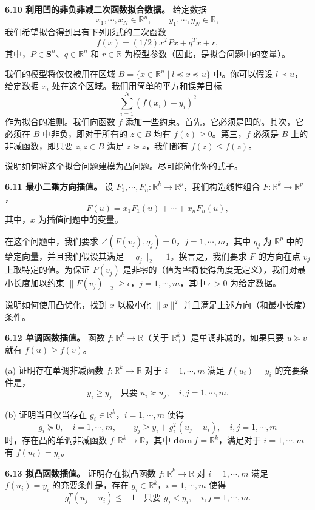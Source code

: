 \documentclass[UTF8,12pt,a4paper,fontset=fandol]{ctexart}
\begin{document}
\noindent\textbf{6.10 利用凹的非负非减二次函数拟合数据。}\quad
给定数据
\[
x_1,\cdots,x_N\in\mathbb{R}^n,\qquad y_1,\cdots,y_N\in\mathbb{R},
\]
我们希望拟合得到具有下列形式的二次函数
\[
f(x)=(1/2)x^TPx+q^Tx+r,
\]
其中，$P\in\mathbf{S}^n$、$q\in\mathbb{R}^n$ 和 $r\in\mathbb{R}$ 为模型参数（因此，是拟合问题中的变量）。

我们的模型将仅仅被用在区域 $B=\{x\in\mathbb{R}^n\mid l\preceq x\preceq u\}$ 中。你可以假设 $l\prec u$，给定数据 $x_i$ 处在这个区域。我们用简单的平方和误差目标
\[
\sum_{i=1}^N(f(x_i)-y_i)^2
\]
作为拟合的准则。我们向函数 $f$ 添加一些约束。首先，它必须是凹的。其次，它必须在 $B$ 中非负，即对于所有的 $z\in B$ 均有 $f(z)\geq 0$。第三，$f$ 必须是 $B$ 上的非减函数，即只要 $z,\bar{z}\in B$ 满足 $z\succeq \bar{z}$，我们都有 $f(z)\leq f(\bar{z})$。

说明如何将这个拟合问题建模为凸问题。尽可能简化你的式子。

\noindent\textbf{6.11 最小二乘方向插值。}\quad
设 $F_1,\cdots,F_n:\mathbb{R}^k\to\mathbb{R}^p$，我们构造线性组合 $F:\mathbb{R}^k\to\mathbb{R}^p$，
\[
F(u)=x_1F_1(u)+\cdots+x_nF_n(u),
\]
其中，$x$ 为插值问题中的变量。

在这个问题中，我们要求 $\angle(F(v_j),q_j)=0$，$j=1,\cdots,m$，其中 $q_j$ 为 $\mathbb{R}^p$ 中的给定向量，并且我们假设其满足 $\|q_j\|_2=1$。换言之，我们要求 $F$ 的方向在点 $v_j$ 上取特定的值。为保证 $F(v_j)$ 是非零的（值为零将使得角度无定义），我们对最小长度加以约束 $\|F(v_j)\|_2\geq \epsilon$，$j=1,\cdots,m$，其中 $\epsilon>0$ 为给定数据。

说明如何使用凸优化，找到 $x$ 以极小化 $\|x\|^2$ 并且满足上述方向（和最小长度）条件。

\noindent\textbf{6.12 单调函数插值。}\quad
函数 $f:\mathbb{R}^k\to\mathbb{R}$（关于 $\mathbb{R}_+^k$）是单调非减的，如果只要 $u\succeq v$ 就有 $f(u)\geq f(v)$。

(a) 证明存在单调非减函数 $f:\mathbb{R}^k\to\mathbb{R}$ 对于 $i=1,\cdots,m$ 满足 $f(u_i)=y_i$ 的充要条件是，
\[
y_i\geq y_j\quad \text{只要 }u_i\succeq u_j,\quad i,j=1,\cdots,m.
\]

(b) 证明当且仅当存在 $g_i\in\mathbb{R}^k$，$i=1,\cdots,m$ 使得
\[
g_i\succeq 0,\quad i=1,\cdots,m,\qquad
y_j\geq y_i+g_i^T(u_j-u_i),\quad i,j=1,\cdots,m
\]
时，存在凸的单调非减函数 $f:\mathbb{R}^k\to\mathbb{R}$，其中 $\mathbf{dom}\ f=\mathbb{R}^k$，满足对于 $i=1,\cdots,m$ 有 $f(u_i)=y_i$。

\noindent\textbf{6.13 拟凸函数插值。}\quad
证明存在拟凸函数 $f:\mathbb{R}^k\to\mathbb{R}$ 对 $i=1,\cdots,m$ 满足 $f(u_i)=y_i$ 的充要条件是，存在 $g_i\in\mathbb{R}^k$，$i=1,\cdots,m$ 使得
\[
g_i^T(u_j-u_i)\leq -1\quad \text{只要 } y_j<y_i,\quad i,j=1,\cdots,m.
\]
\end{document}
